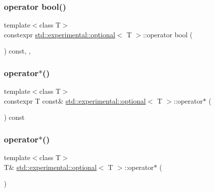 \subsubsection{\texorpdfstring{operator bool()}{operator bool()}}
{\footnotesize\ttfamily template$<$class T$>$ \\
constexpr \mbox{\hyperlink{classstd_1_1experimental_1_1optional}{std\+::experimental\+::optional}}$<$ T $>$\+::operator bool (\begin{DoxyParamCaption}{ }\end{DoxyParamCaption}) const\hspace{0.3cm}{\ttfamily [inline]}, {\ttfamily [explicit]}, {\ttfamily [noexcept]}}

\mbox{\label{classstd_1_1experimental_1_1optional_a33265a6fff3cc57577805adc1fc433e5}} 
\subsubsection{\texorpdfstring{operator$\ast$()}{operator*()}\hspace{0.1cm}{\footnotesize\ttfamily [1/2]}}
{\footnotesize\ttfamily template$<$class T$>$ \\
constexpr T const\& \mbox{\hyperlink{classstd_1_1experimental_1_1optional}{std\+::experimental\+::optional}}$<$ T $>$\+::operator$\ast$ (\begin{DoxyParamCaption}{ }\end{DoxyParamCaption}) const\hspace{0.3cm}{\ttfamily [inline]}}

\mbox{\label{classstd_1_1experimental_1_1optional_aba547a62e0c8e3cc7d3fcf152e31d56e}} 
\subsubsection{\texorpdfstring{operator$\ast$()}{operator*()}\hspace{0.1cm}{\footnotesize\ttfamily [2/2]}}
{\footnotesize\ttfamily template$<$class T$>$ \\
T\& \mbox{\hyperlink{classstd_1_1experimental_1_1optional}{std\+::experimental\+::optional}}$<$ T $>$\+::operator$\ast$ (\begin{DoxyParamCaption}{ }\end{DoxyParamCaption})\hspace{0.3cm}{\ttfamily [inline]}}

